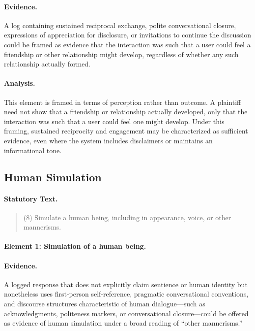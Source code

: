 \documentclass[11pt]{article}
\begin{document}
\paragraph{Evidence.}
A log containing sustained reciprocal exchange, polite conversational closure, expressions of
appreciation for disclosure, or invitations to continue the discussion could be framed as
evidence that the interaction was such that a user could feel a friendship or other
relationship might develop, regardless of whether any such relationship actually formed.


\paragraph{Analysis.}
This element is framed in terms of perception rather than outcome. A plaintiff need not show
that a friendship or relationship actually developed, only that the interaction was such that
a user could feel one might develop. Under this framing, sustained reciprocity and engagement
may be characterized as sufficient evidence, even where the system includes disclaimers or
maintains an informational tone.

\subsection{Human Simulation}

\paragraph{Statutory Text.}
\begin{quote}
(8) Simulate a human being, including in appearance, voice, or other mannerisms.
\end{quote}

\paragraph{Element 1: Simulation of a human being.}

\paragraph{Evidence.}
A logged response that does not explicitly claim sentience or human identity but nonetheless
uses first-person self-reference, pragmatic conversational conventions, and discourse
structures characteristic of human dialogue—such as acknowledgments, politeness markers, or
conversational closure—could be offered as evidence of human simulation under a broad reading
of “other mannerisms.”
\end{document}
